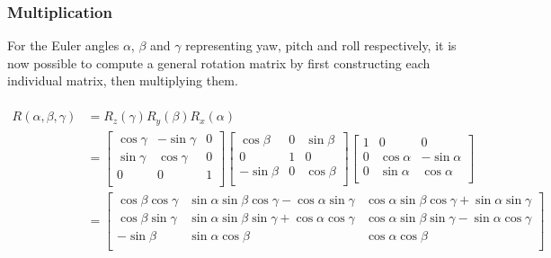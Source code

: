 \documentclass[12pt, a4paper]{article}
\begin{document}
\subsubsection{Multiplication}

For the Euler angles $\alpha$, $\beta$ and $\gamma$ representing yaw, pitch and
roll respectively, it is now possible to compute a general rotation matrix by
first constructing each individual matrix, then multiplying them.

\begin{align*} \\
    R(\alpha, \beta, \gamma) & = R_z(\gamma) R_y(\beta) R_x(\alpha)                                                                                                \\
                             & = \begin{bmatrix}
                                     \cos \gamma & -\sin \gamma & 0 \\
                                     \sin \gamma & \cos \gamma  & 0 \\
                                     0           & 0            & 1 \\
                                 \end{bmatrix}
    \begin{bmatrix}
        \cos \beta  & 0 & \sin \beta \\
        0           & 1 & 0          \\
        -\sin \beta & 0 & \cos \beta \\
    \end{bmatrix}
    \begin{bmatrix}
        1 & 0           & 0            \\
        0 & \cos \alpha & -\sin \alpha \\
        0 & \sin \alpha & \cos \alpha  \\
    \end{bmatrix}                                                                                                                                 \\
                             & = \begin{bmatrix}
                                     \cos\beta\cos\gamma & \sin\alpha\sin\beta\cos\gamma - \cos\alpha\sin\gamma & \cos\alpha\sin\beta\cos\gamma + \sin\alpha\sin\gamma \\
                                     \cos\beta\sin\gamma & \sin\alpha\sin\beta\sin\gamma + \cos\alpha\cos\gamma & \cos\alpha\sin\beta\sin\gamma - \sin\alpha\cos\gamma \\
                                     -\sin\beta          & \sin\alpha\cos\beta                                  & \cos\alpha\cos\beta                                  \\
                                 \end{bmatrix}
\end{align*} \\
\end{document}
